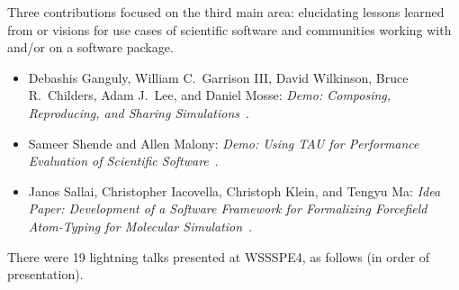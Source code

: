 \documentclass[11pt, oneside]{amsart}
\newcommand{\note}[1]{ {\textcolor{blueish}    { ***Note:      #1 }}}
\begin{document}
\noindent Three contributions focused on the third main area: elucidating lessons learned
from or visions for use cases of scientific software and communities working
with and\slash or on a software package.

\begin{itemize}

\item Debashis Ganguly, William C.\ Garrison III, David Wilkinson,
Bruce R.\ Childers, Adam J.\ Lee, and Daniel Mosse\textsuperscript{\textasteriskcentered}: \emph{Demo: Composing,
Reproducing, and Sharing Simulations}~\cite{Ganguly:2016ws}.

\item Sameer Shende\textsuperscript{\textasteriskcentered} and Allen Malony: \emph{Demo: Using TAU for
Performance Evaluation of Scientific Software}~\cite{Shende:2016ws}.

\item Janos Sallai\textsuperscript{\textasteriskcentered}, Christopher Iacovella, Christoph Klein, and Tengyu Ma:
\emph{Idea Paper: Development of a Software Framework for Formalizing Forcefield
Atom-Typing for Molecular Simulation}~\cite{Sallai:2016ws}.

\end{itemize}



\begin{comment}
\note{
\href{http://wssspe.researchcomputing.org.uk/wssspe4/agenda/}{Slides.}}
\end{comment}

\noindent There were 19 lightning talks presented at WSSSPE4, as follows (in order of
presentation).
%
\end{document}
